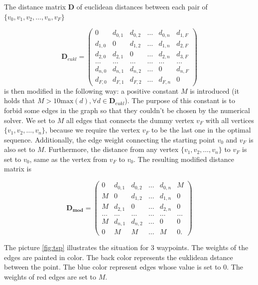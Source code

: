 The distance matrix $\mathbf{D}$ of euclidean distances between each pair of $\{v_{0}, v_{1}, v_{2}, \dots,v_{n},  v_{F}\}$ 

\begin{equation}
  \mathbf{D}_{eukl} = 
  \begin{pmatrix}
    0 & d_{0,1} & d_{0,2} & \dots & d_{0, n} & d_{1, F} \\
    d_{1,0} & 0 & d_{1,2} & \dots & d_{1, n} & d_{2, F} \\
    d_{2,0} & d_{2,1} & 0       & \dots & d_{2, n} & d_{3, F} \\
    \dots&\dots & \dots & \dots & \dots & \dots \\
    d_{n,0}& d_{n, 1} & d_{n, 2} & \dots & 0 & d_{n, F} \\
    d_{F, 0} & d_{F,1} & d_{F,2} & \dots & d_{F, n} & 0 
\end{pmatrix}
\end{equation}
is then modified in the following way:
a positive constant $M$ is introduced (it holds that $M>10\mathrm{max}(d),  \forall d \in \mathbf{D}_{eukl}$).
The purpose of this constant is to forbid some edges in the graph so that they couldn't be chosen by the numerical solver.
We set to $M$ all edges that connects the dummy vertex $v_{F}$ with all vertices $\{v_{1},v_{2}, \dots, v_{n}\}$, because we require the vertex $v_{F}$ to be the last one in the optimal sequence.
Additionally, the edge weight connecting the starting point $v_{0}$ and $v_{F}$ is also set to $M$.
Furthermore, the distance from any vertex $\{v_{1}, v_{2}, \dots, v_{n}\}$ to $v_{F}$ is set to $v_{0}$, same as the vertex from $v_{F}$ to $v_{0}$. 
The resulting modified distance matrix is

\begin{equation}
  \mathbf{D_{mod}} = 
  \begin{pmatrix}
    0 & d_{0,1} & d_{0,2} & \dots & d_{0, n} & M \\
    M & 0 & d_{1,2} & \dots & d_{1, n} & 0 \\
    M & d_{2,1} & 0       & \dots & d_{2, n} & 0 \\
    \dots&\dots & \dots & \dots & \dots & \dots \\
    M & d_{n, 1} & d_{n, 2} & \dots & 0 & 0 \\
    0 & M & M & \dots & M & 0 .  
\end{pmatrix}
\end{equation}

The picture \ref{fig:tsp} illustrates the situation for 3 waypoints.
The weights of the edges are painted in color.
The back color represents the euklidean dstance between the point.
The blue color represent edges whose value is set to $0$.
The weights of red edges are set to $M$.

